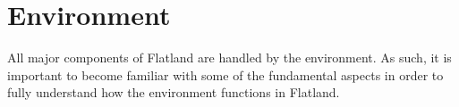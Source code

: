 \section{Environment}\label{sec:environment}
All major components of Flatland are handled by the environment.  As such, it is important to become familiar with some of the fundamental aspects in order to fully understand how the environment functions in Flatland.
